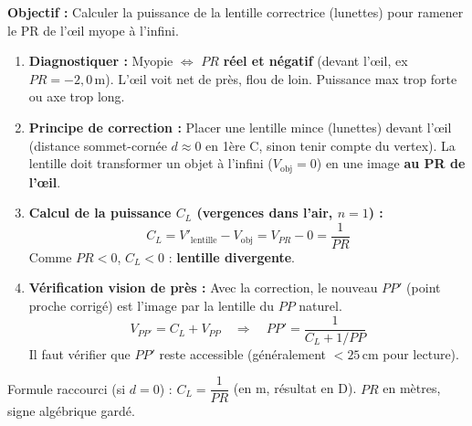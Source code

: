 \documentclass[11pt]{article}
\newcommand{\cle}[1]{{\popxbold\color{popdark}#1}}
\begin{document}
\begin{methode}
\textbf{Objectif :} Calculer la puissance de la lentille correctrice (lunettes) pour ramener le PR de l'œil myope à l'infini.
\begin{enumerate}
    \item \textbf{Diagnostiquer :} Myopie $\Leftrightarrow$ $PR$ \textbf{réel et négatif} (devant l'œil, ex $PR = -2,0\,\text{m}$). L'œil voit net de près, flou de loin. Puissance max trop forte ou axe trop long.
    \item \textbf{Principe de correction :} Placer une lentille mince (lunettes) devant l'œil (distance sommet-cornée $d \approx 0$ en 1ère C, sinon tenir compte du vertex). La lentille doit transformer un objet à l'infini ($V_{\text{obj}} = 0$) en une image \textbf{au PR de l'œil}.
    \item \textbf{Calcul de la puissance $C_L$ (vergences dans l'air, $n=1$) :}
    \[
    C_L = V'_{\text{lentille}} - V_{\text{obj}} = V_{PR} - 0 = \frac{1}{PR}
    \]
    Comme $PR < 0$, $C_L < 0$ : \textbf{lentille divergente}.
    \item \textbf{Vérification vision de près :} Avec la correction, le nouveau $PP'$ (point proche corrigé) est l'image par la lentille du $PP$ naturel.
    \[
    V_{PP'} = C_L + V_{PP} \quad \Rightarrow \quad PP' = \frac{1}{C_L + 1/PP}
    \]
    Il faut vérifier que $PP'$ reste accessible (généralement $< 25\,\text{cm}$ pour lecture).
\end{enumerate}
\cle{Formule raccourci (si $d=0$) :} $C_L = \dfrac{1}{PR}$ (en m, résultat en D). $PR$ en mètres, signe algébrique gardé.
\end{methode}
\end{document}
